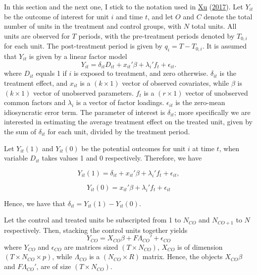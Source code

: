 \documentclass[12pt,nobind, a4paper]{reedthesis}
\begin{document}
 In this section and the next one, I stick to the notation used in \protect\hyperlink{ref-xu_generalized_2017}{Xu} (\protect\hyperlink{ref-xu_generalized_2017}{2017}). Let \(Y_{it}\) be the outcome of interest for unit \(i\) and time \(t\), and let \(O\) and \(C\) denote the total number of units in the treatment and control groups, with \(N\) total units. All units are observed for \(T\) periods, with the pre-treatment periods denoted by \(T_{0, i}\) for each unit. The post-treatment period is given by \(q_{i}=T-T_{0,i}\). It is assumed that \(Y_{it}\) is given by a linear factor model
 \begin{equation}
 Y_{it}=\delta_{it} D_{it}+ x_{it}'\beta+ \lambda_{i}'f_{t}+\epsilon_{it}.
 \end{equation}
 where \(D_{it}\) equals 1 if \(i\) is exposed to treatment, and zero otherwise. \(\delta_{it}\) is the treatment effect, and \(x_{it}\) is a \((k \times 1)\) vector of observed covariates, while \(\beta\) is \((k \times 1)\) vector of unobserved parameters. \(f_{t}\) is a \((r \times 1)\) vector of unobserved common factors and \(\lambda_{i}\) is a vector of factor loadings. \(\epsilon_{it}\) is the zero-mean idiosyncratic error term. The parameter of interest is \(\delta_{it}\); more specifically we are interested in estimating the average treatment effect on the treated unit, given by the sum of \(\delta_{it}\) for each unit, divided by the treatment period.
 \linebreak

 Let \(Y_{it}(1)\) and \(Y_{it}(0)\) be the potential outcomes for unit \(i\) at time \(t\), when variable \(D_{it}\) takes values 1 and 0 respectively. Therefore, we have

 \[Y_{it}(1)=\delta_{it}+ x_{it}'\beta+ \lambda_{i}'f_{t}+\epsilon_{it},\]

 \[Y_{it}(0)=x_{it}'\beta + \lambda_{i}'f_{t}+\epsilon_{it}\]

 Hence, we have that \(\delta_{it}= Y_{it}(1)-Y_{it}(0).\)

 Let the control and treated units be subscripted from 1 to \(N_{CO}\) and \(N_{CO+1}\) to \(N\) respectively. Then, stacking the control units together yields
 \begin{equation}
 Y_{CO}=X_{CO} \beta+ F \Lambda_{CO}'+\epsilon_{CO}
 \end{equation}
 where \(Y_{CO}\) and \(\epsilon_{CO}\) are matrices sized \((T \times N_{CO})\), \(X_{CO}\) is of dimension \((T \times N_{CO} \times p)\), while \(\Lambda_{CO}\) is a \((N_{CO} \times R)\) matrix. Hence, the objects \(X_{CO} \beta\) and \(F\Lambda_{CO}'\), are of size \((T \times N_{CO})\).
 \newpage
\end{document}
